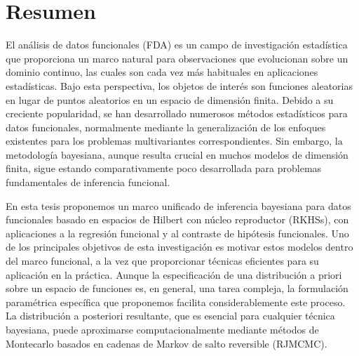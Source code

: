

\begingroup

\let\clearpage\relax
\let\cleardoublepage\relax
\let\cleardoublepage\relax

\chapter*{Resumen}

El análisis de datos funcionales (\acs{FDA}) es un campo de investigación estadística que proporciona un marco natural para observaciones que evolucionan sobre un dominio continuo, las cuales son cada vez más habituales en aplicaciones estadísticas. Bajo esta perspectiva, los objetos de interés son funciones aleatorias en lugar de puntos aleatorios en un espacio de dimensión finita. Debido a su creciente popularidad, se han desarrollado numerosos métodos estadísticos para datos funcionales, normalmente mediante la generalización de los enfoques existentes para los problemas multivariantes correspondientes. Sin embargo, la metodología bayesiana, aunque resulta crucial en muchos modelos de dimensión finita, sigue estando comparativamente poco desarrollada para problemas fundamentales de inferencia funcional.

En esta tesis proponemos un marco unificado de inferencia bayesiana para datos funcionales basado en espacios de Hilbert con núcleo reproductor (\acs{RKHSs}), con aplicaciones a la regresión funcional y al contraste de hipótesis funcionales. Uno de los principales objetivos de esta investigación es motivar estos modelos dentro del marco funcional, a la vez que proporcionar técnicas eficientes para su aplicación en la práctica. Aunque la especificación de una distribución a priori sobre un espacio de funciones es, en general, una tarea compleja, la formulación paramétrica específica que proponemos facilita considerablemente este proceso. La distribución a posteriori resultante, que es esencial para cualquier técnica bayesiana, puede aproximarse computacionalmente mediante métodos de Montecarlo basados en cadenas de Markov de salto reversible (\acs{RJMCMC}).


